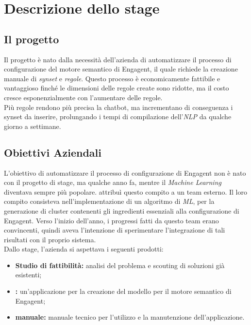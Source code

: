 
\chapter{Descrizione dello stage}
\label{cap:descrizione-stage}

\section{Il progetto}\label{sec:progetto}

Il progetto è nato dalla necessità dell'azienda \company{} di automatizzare il processo di configurazione del motore semantico di \gls{Engagent}\glsfirstoccur{}, il quale richiede la creazione manuale di \emph{synset}\glsfirstoccur{} e \emph{regole}\glsfirstoccur{}. Questo processo è economicamente fattibile e vantaggioso finché le dimensioni delle regole create sono ridotte, ma il costo cresce esponenzialmente con l'aumentare delle regole.\\
Più regole rendono più precisa la chatbot, ma incrementano di conseguenza i \gls{synset}\glsfirstoccur{} da inserire, prolungando i tempi di compilazione dell'\emph{NLP}\glsfirstoccur{} da qualche giorno a settimane.

\section{Obiettivi Aziendali}
L'obiettivo di automatizzare il processo di configurazione di Engagent non è nato con il progetto di stage, ma qualche anno fa, mentre il \textit{Machine Learning} diventava sempre più popolare. \company{} attribuì questo compito a un team esterno. Il loro compito consisteva nell'implementazione di un algoritmo di \textit{ML}, per la generazione di cluster contenenti gli ingredienti essenziali alla configurazione di Engagent.
Verso l'inizio dell'anno, i progressi fatti da questo team erano convincenti, quindi \company{} aveva l'intenzione di sperimentare l'integrazione di tali risultati con il proprio sistema.\\
Dallo stage, l'azienda si aspettava i seguenti prodotti:
\begin{itemize}
    \item \textbf{Studio di fattibilità:} analisi del problema e \gls{scouting}\glsfirstoccur{} di soluzioni già esistenti;
    \item \textbf{\app{}:} un'applicazione per la creazione del modello per il motore semantico di Engagent;
    \item \textbf{manuale:} manuale tecnico per l'utilizzo e la manutenzione dell'applicazione.    
\end{itemize}

